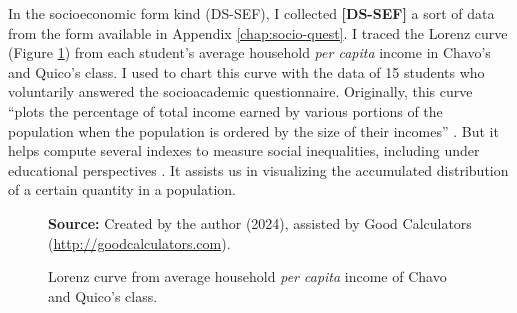 In the socioeconomic form kind (\acrfull{DS-SEF}), I collected \textbf{[DS-SEF]} a sort of data from the form available in Appendix \ref{chap:socio-quest}. I traced the Lorenz curve (Figure \ref{fig:lorenz-curve-classroom}) from each student's average household \textit{per capita} income in Chavo's and Quico’s class. I used to chart this curve with the data of 15 students who voluntarily answered the socioacademic questionnaire. Originally, this curve “plots the percentage of total income earned by various portions of the population when the population is ordered by the size of their incomes” \cite{gastwirth:1971}. But it helps compute several indexes to measure social inequalities, including under educational perspectives \cite{thomas:2003}. It assists us in visualizing the accumulated distribution of a certain quantity in a population.

\begin{figure}[ht!]
\centering

\caption{\textmd{Lorenz curve from average household \textit{per capita} income of Chavo and Quico’s class.}}
\label{fig:lorenz-curve-classroom}

\par\medskip\ABNTEXfontereduzida\selectfont\textbf{Source:} Created by the author (2024), assisted by Good Calculators (\url{http://goodcalculators.com}).%
\end{figure}

